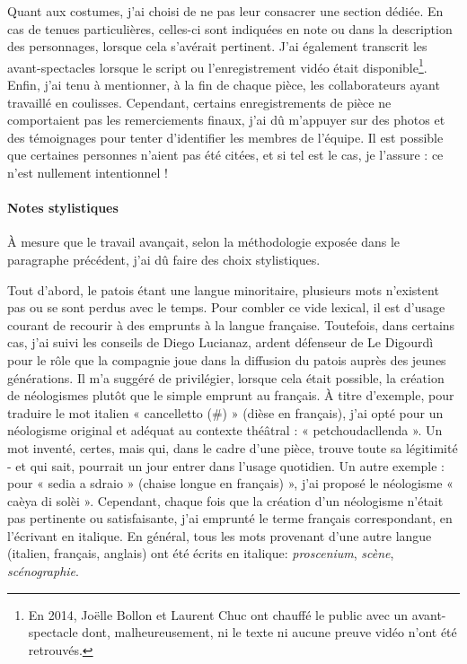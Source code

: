 Quant aux costumes, j'ai choisi de ne pas leur consacrer une section dédiée. En cas de tenues particulières, celles-ci sont indiquées en note ou dans la description des personnages, lorsque cela s’avérait pertinent.
J'ai également transcrit les avant-spectacles lorsque le script ou l'enregistrement vidéo était disponible\footnote{ En 2014, Jo\"elle Bollon et Laurent Chuc ont chauffé le public avec un avant-spectacle dont, malheureusement, ni le texte ni aucune preuve vidéo n'ont été retrouvés.}. Enfin, j’ai tenu à mentionner, à la fin de chaque pièce, les collaborateurs ayant travaillé en coulisses. Cependant, certains enregistrements de pièce ne comportaient pas les remerciements finaux, j’ai dû m’appuyer sur des photos et des témoignages pour tenter d’identifier les membres de l’équipe. Il est possible que certaines personnes n’aient pas été citées, et si tel est le cas, je l’assure : ce n’est nullement intentionnel !

\paragraph*{Notes stylistiques}
À mesure que le travail avançait, selon la méthodologie exposée dans le paragraphe précédent, j'ai dû faire des choix stylistiques.

Tout d’abord, le patois étant une langue minoritaire, plusieurs mots n'existent pas ou se sont perdus avec le temps. Pour combler ce vide lexical, il est d'usage courant de recourir à des emprunts à la langue française. Toutefois, dans certains cas, j'ai suivi les conseils de Diego Lucianaz, ardent défenseur de Le Digourdì pour le rôle que la compagnie joue dans la diffusion du patois auprès des jeunes générations. Il m'a suggéré de privilégier, lorsque cela était possible, la création de néologismes plutôt que le simple emprunt au français. À titre d'exemple, pour traduire le mot italien « cancelletto (\#) » (dièse en français), j’ai opté pour un néologisme original et adéquat au contexte théâtral : « petchoudacllenda ». Un mot inventé, certes, mais qui, dans le cadre d’une pièce, trouve toute sa légitimité - et qui sait, pourrait un jour entrer dans l’usage quotidien. Un autre exemple : pour « sedia a sdraio » (chaise longue en français) », j'ai proposé le néologisme « caèya di solèi ».
Cependant, chaque fois que la création d’un néologisme n’était pas pertinente ou satisfaisante, j’ai emprunté le terme français correspondant, en l’écrivant en italique. En général, tous les mots provenant d'une autre langue (italien, français, anglais) ont été écrits en italique: \textit{proscenium}, \textit{scène}, \textit{scénographie}.

